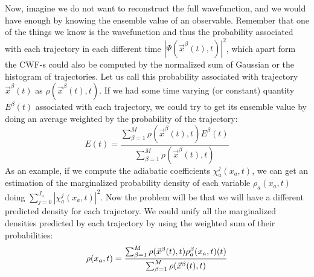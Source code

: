 \documentclass[11pt, a4paper]{article} %
\begin{document}
Now, imagine we do not want to reconstruct the full wavefunction, and we would have enough by knowing the ensemble value of an observable. Remember that one of the things we know is the wavefunction and thus the probability associated with each trajectory in each different time $|\Psi(\vec{x}^\beta (t),t)|^2$, which apart form the CWF-s could also be computed by the normalized sum of Gaussian or the histogram of trajectories. Let us call this probability associated with trajectory $\vec{x}^\beta(t)$ as $\rho(\vec{x}^\beta(t),t)$. If we had some time varying (or constant) quantity $E^\beta(t)$ associated with each trajectory, we could try to get its ensemble value by doing an average weighted by the probability of the trajectory:
$$
E(t)=\frac{\sum_{\beta=1}^M \rho(\vec{x}^\beta(t),t) E^\beta(t)}{\sum_{\beta=1}^M \rho(\vec{x}^\beta(t),t)}
$$
As an example, if we compute the adiabatic coefficients $\chi^j_a(x_a,t)$, we can get an estimation of the marginalized probability density of each variable $\rho_a(x_a,t)$ doing $\sum_{j=0}^{J_a}|\chi^j_a(x_a,t)|^2$. Now the problem will be that we will have a different predicted density for each trajectory. We could unify all the marginalized densities predicted by each trajectory by using the weighted sum of their probabilities:
$$
\rho(x_a,t)=\frac{\sum_{\beta=1}^M \rho(\vec{x}^\beta(t),t) \rho_a^\beta(x_a,t)(t)}{\sum_{\beta=1}^M \rho(\vec{x}^\beta(t),t)}\vspace{-0.1cm}
$$
\end{document}
